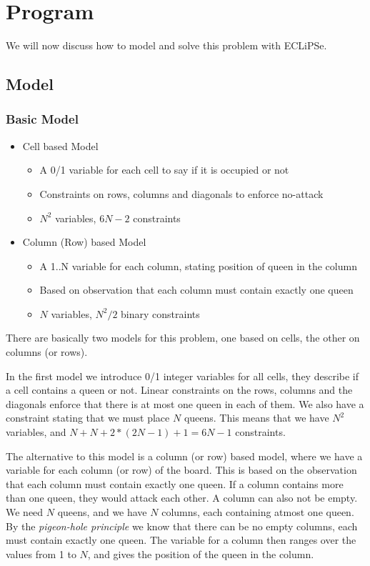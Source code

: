 \section{Program}
We will now discuss how to model and solve this problem with ECLiPSe.

\subsection{Model}

\begin{frame}
\frametitle{Basic Model}
\begin{itemize}
\item Cell based Model
\begin{itemize}
\item A 0/1 variable for each cell to say if it is occupied or not
\item Constraints on rows, columns and diagonals to enforce no-attack
\item $N^2$ variables, $6N-2$ constraints
\end{itemize}
\item Column (Row) based Model
\begin{itemize}
\item A 1..N variable for each column, stating position of queen in the column
\item Based on observation that each column must contain exactly one queen
\item $N$ variables, $N^2/2$ binary constraints
\end{itemize}
\end{itemize}
\end{frame}

There are basically two models for this problem, one based on cells, the other on columns (or rows).

In the first model we introduce 0/1 integer variables for all cells, they describe if a cell contains a queen or not. Linear constraints on the rows, columns and the diagonals enforce that there is at most one queen in each of them. We also have a constraint stating that we must place $N$ queens. This means that we have $N^2$ variables, and $N+N+2*(2N-1)+1 = 6N-1$ constraints.

The alternative to this model is a column (or row) based model, where we have a variable for each column (or row) of the board. This is based on the observation that each column must contain exactly one queen. If a column contains more than one queen, they would attack each other. A column can also not be empty. We need $N$ queens, and we have $N$ columns, each containing atmost one queen. By the {\em pigeon-hole principle} we know that there can be no empty columns, each must contain exactly one queen. The variable for a column then ranges over the values from 1 to $N$, and gives the position of the queen in the column.

